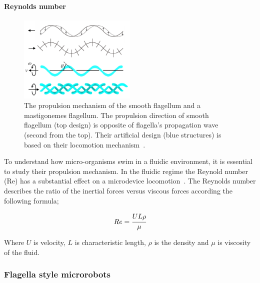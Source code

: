 \documentclass[12pt,a4paper,titlepage]{report}
\begin{document}
\paragraph{Reynolds number}




\begin{figure}
  \begin{center}
    \includegraphics[width=0.5\textwidth]{10}
  \caption[Propulsion mechanism of mastigonemes flagellum]{ The propulsion mechanism of the smooth flagellum and a mastigonemes flagellum.
The propulsion direction of smooth flagellum (top design) is opposite of flagella\rq{}s propagation 
wave (second from the top). Their artificial design (blue structures) is based on 
their locomotion mechanism~\citep{gao2013bioinspired}.}
  \label{10}
\end{center}
\end{figure}



To understand how micro-organisms swim in a fluidic environment, it is essential to study their propulsion 
mechanism. In the fluidic regime the Reynold number (Re) has a substantial effect on a microdevice
locomotion~\citep{peyer2013magnetic}. The Reynolds number describes the ratio of the inertial forces versus viscous 
forces according the following formula;




\begin{equation}
  Re = \cfrac{UL\rho}{\mu}
\label{eq:4}
\end{equation}
 
Where $ U$ is velocity, $L$ is characteristic length, $\rho$ is the density and $\mu$ is viscosity of the fluid.



\subsubsection{Flagella style microrobots}
\end{document}
